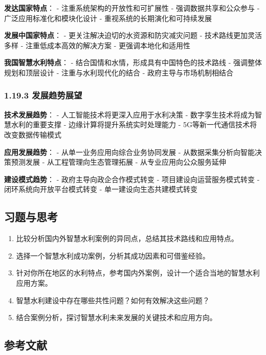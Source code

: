 \textbf{发达国家特点}： - 注重系统架构的开放性和可扩展性 -
强调数据共享和公众参与 - 广泛应用标准化和模块化设计 -
重视系统的长期演化和可持续发展

\textbf{发展中国家特点}： - 更关注解决迫切的水资源和防灾减灾问题 -
技术路线更加灵活多样 - 注重低成本高效的解决方案 - 更强调本地化和适用性

\textbf{我国智慧水利特点}： - 结合国情和水情，形成具有中国特色的技术路线
- 强调整体规划和顶层设计 - 注重与水利现代化的结合 -
政府主导与市场机制相结合

\subsubsection{1.19.3
发展趋势展望}\label{ux53d1ux5c55ux8d8bux52bfux5c55ux671b}

\textbf{技术发展趋势}： - 人工智能技术将更深入应用于水利决策 -
数字孪生技术将成为智慧水利的重要支撑 - 边缘计算将提升系统实时处理能力 -
5G等新一代通信技术将改变数据传输模式

\textbf{应用发展趋势}： - 从单一业务应用向综合业务协同发展 -
从数据采集分析向智能决策预测发展 - 从工程管理向生态管理拓展 -
从专业应用向公众服务延伸

\textbf{建设模式趋势}： - 政府主导向政企合作模式转变 -
项目建设向运营服务模式转变 - 闭环系统向开放平台模式转变 -
单一建设向生态共建模式转变

\subsection{习题与思考}\label{ux4e60ux9898ux4e0eux601dux8003}

\begin{enumerate}
\def\labelenumi{\arabic{enumi}.}
\tightlist
\item
  比较分析国内外智慧水利案例的异同点，总结其技术路线和应用特点。
\item
  选择一个智慧水利成功案例，分析其成功因素和可借鉴经验。
\item
  针对你所在地区的水利特点，参考国内外案例，设计一个适合当地的智慧水利应用方案。
\item
  智慧水利建设中存在哪些共性问题？如何有效解决这些问题？
\item
  结合案例分析，探讨智慧水利未来发展的关键技术和应用方向。
\end{enumerate}

\subsection{参考文献}\label{ux53c2ux8003ux6587ux732e}

